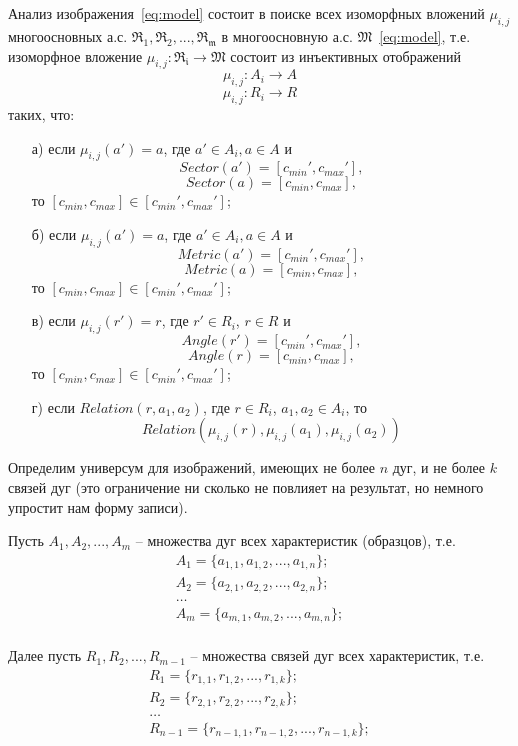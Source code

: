 Анализ изображения~\ref{eq:model} состоит в поиске всех изоморфных вложений ${ \mu_{i,j} }$ многоосновных а.с. $\mathfrak{R_1,R_2,...,R_m}$ в многоосновную а.с. $\mathfrak{M}$~\ref{eq:model}, т.е. изоморфное вложение $\mu_{i,j} : \mathfrak{R_i} \rightarrow \mathfrak{M}$ состоит из инъективных отображений
$$\mu_{i,j} : A_i \rightarrow A$$
$$\mu_{i,j} : R_i \rightarrow R$$
таких, что:
\begin{enumerate}
\item[а)] если $\mu_{i,j}(a') = a$, где $a' \in A_i, a \in A$ и 
$$Sector(a') = [c_{min}', c_{max}'],$$
$$Sector(a) = [c_{min}, c_{max}],$$
то $[c_{min}, c_{max}] \in [c_{min}', c_{max}']$;
\item[б)] если $\mu_{i,j}(a') = a$, где $a' \in A_i, a \in A$ и 
$$Metric(a') = [c_{min}', c_{max}'],$$
$$Metric(a) = [c_{min}, c_{max}],$$
то $[c_{min}, c_{max}] \in [c_{min}', c_{max}']$;
\item[в)] если $\mu_{i,j}(r') = r$, где $r' \in R_i$, $r \in R$ и 
$$Angle(r') =  [c_{min}', c_{max}'],$$
$$Angle(r) = [c_{min}, c_{max}],$$
то $[c_{min}, c_{max}] \in [c_{min}', c_{max}']$;
\item[г)] если $Relation(r, a_1, a_2)$, где $r \in R_i$, $a_1, a_2 \in A_i$, то 
$$Relation(\mu_{i,j}(r), \mu_{i,j}(a_1), \mu_{i,j}(a_2))$$
\end{enumerate}

Определим универсум для изображений, имеющих не более $n$ дуг, и не более $k$ связей дуг (это ограничение ни сколько не повлияет на результат, но немного упростит нам форму записи).

Пусть $A_1, A_2, ..., A_m$ – множества дуг всех характеристик (образцов), т.е.
\begin{equation}
\begin{array}{c}
A_1 = \{a_{1,1}, a_{1,2}, ..., a_{1,n}\}; \\
A_2 = \{ a_{2,1}, a_{2,2}, ..., a_{2,n}\}; \\
\dots \\
A_m = \{ a_{m,1}, a_{m,2}, ..., a_{m,n}\}; \\
\end{array}
\end{equation}

Далее пусть $R_1, R_2, ..., R_{m-1}$ – множества связей дуг всех характеристик, т.е. 
\begin{equation}
\begin{array}{c}
R_1 = \{r_{1,1}, r_{1,2}, ..., r_{1,k}\}; \\
R_2 = \{ r_{2,1}, r_{2,2}, ..., r_{2,k}\}; \\
\dots \\
R_{n-1} = \{ r_{{n-1},1}, r_{{n-1},2}, ..., r_{{n-1},k}\}; \\
\end{array}
\end{equation}

